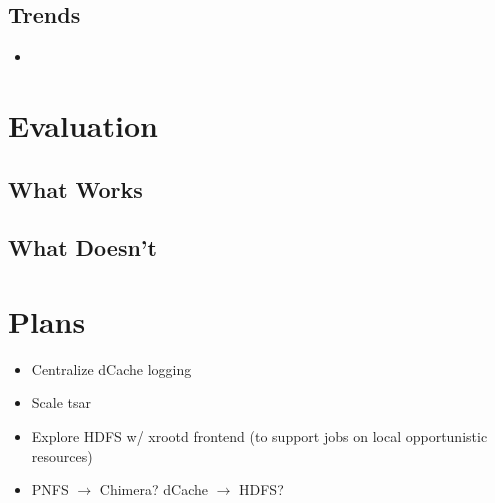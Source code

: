 \documentclass{beamer}
\begin{document}
\subsection{Trends} %
\begin{frame}
\begin{itemize}
	\item 
\end{itemize}
\end{frame}

\section{Evaluation}
\subsection{What Works}
\subsection{What Doesn't}

\section{Plans}
\begin{frame}
\begin{itemize}
	\item Centralize dCache logging
	\item Scale tsar
	\item Explore HDFS w/ xrootd frontend (to support jobs on local opportunistic resources)
	\item PNFS $\rightarrow$ Chimera? dCache $\rightarrow$ HDFS?
\end{itemize}
\end{frame}
\end{document}
